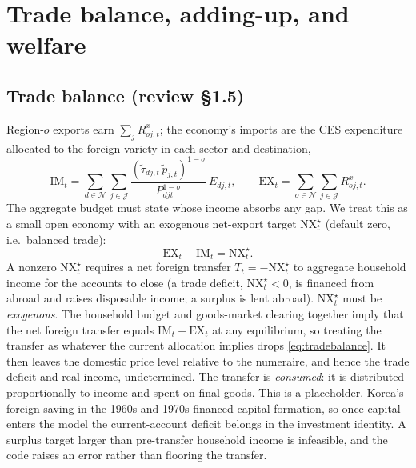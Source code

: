 \documentclass[11pt]{article}
\newcommand{\Nreg}{\mathcal{N}}
\newcommand{\Sct}{\mathcal{J}}
\begin{document}
\section{Trade balance, adding-up, and welfare}\label{sec:walras}
\subsection{Trade balance (review \S1.5)}
Region-$o$ exports earn $\sum_j R^{x}_{oj,t}$; the economy's imports are the CES
expenditure allocated to the foreign variety in each sector and destination,
\begin{equation}
  \mathrm{IM}_t
  = \sum_{d\in\Nreg}\sum_{j\in\Sct}
    \frac{(\tilde\tau_{dj,t}\,\tilde p_{j,t})^{1-\sigma}}{P_{djt}^{1-\sigma}}\, E_{dj,t},
  \qquad
  \mathrm{EX}_t = \sum_{o\in\Nreg}\sum_{j\in\Sct} R^{x}_{oj,t}.
\end{equation}
The aggregate budget must state whose income absorbs any gap. We treat this as a small
open economy with an exogenous net-export target $\mathrm{NX}^{\star}_t$ (default zero,
i.e.\ balanced trade):
\begin{equation}
  \mathrm{EX}_t - \mathrm{IM}_t = \mathrm{NX}^{\star}_t .
  \label{eq:tradebalance}
\end{equation}
A nonzero $\mathrm{NX}^{\star}_t$ requires a net foreign transfer
$T_t=-\mathrm{NX}^{\star}_t$ to aggregate household income for the accounts to close (a
trade deficit, $\mathrm{NX}^{\star}_t<0$, is financed from abroad and raises disposable
income; a surplus is lent abroad). $\mathrm{NX}^{\star}_t$ must be
\emph{exogenous}. The household budget and goods-market clearing together imply that the net
foreign transfer equals $\mathrm{IM}_t-\mathrm{EX}_t$ at any equilibrium, so treating the
transfer as whatever the current allocation implies drops \eqref{eq:tradebalance}. It then
leaves the domestic price level relative to the numeraire, and hence the trade deficit and
real income, undetermined.
The transfer is \emph{consumed}: it is distributed proportionally to income and spent
on final goods. This is a placeholder. Korea's foreign saving in the 1960s and 1970s financed
capital formation, so once capital enters the model the current-account deficit belongs in
the investment identity. A surplus target larger than pre-transfer household income is
infeasible, and the code raises an error rather than flooring the transfer.
\end{document}
